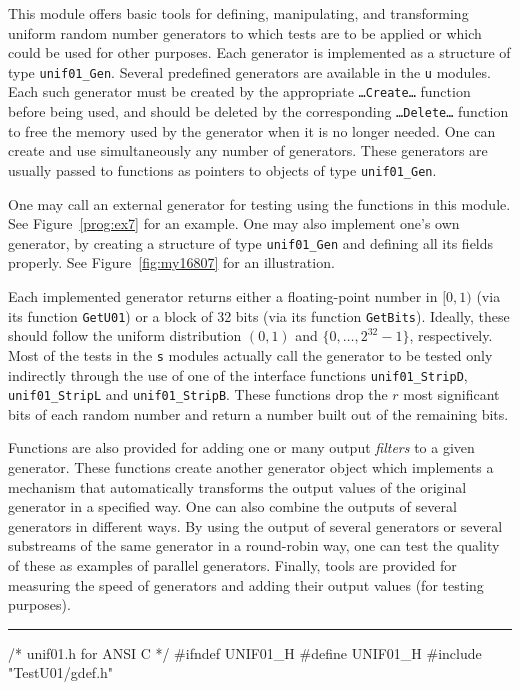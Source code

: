 
This module offers basic tools for defining, manipulating, and
transforming uniform random number generators to which tests are
to be applied or which could be used for other purposes.
Each generator is implemented as a
structure of type {\tt unif01\_Gen}.
Several predefined generators are available in the {\tt u} modules.
Each such generator must be created by the appropriate
{\tt \ldots Create\ldots} function before being used, and should
be deleted by the corresponding {\tt \ldots Delete\ldots} function
to free the memory used by the generator when it is no longer needed.
One can create and use simultaneously any number of generators.
These generators are usually passed to functions as pointers to
objects of type {\tt unif01\_Gen}.

One may call an external generator for testing using the functions in
this module. See Figure~\ref{prog:ex7} for an example.
One may also implement one's own generator, by creating a structure of
type {\tt unif01\_Gen} and defining all its fields properly.
See Figure~\ref{fig:my16807} for an illustration.

Each implemented generator returns either a floating-point
number in $[0, 1)$ (via its function {\tt GetU01})
or a block of 32 bits (via its function {\tt GetBits}).
Ideally, these should follow the uniform distribution $(0,1)$
and $\{0,\dots,2^{32}-1\}$, respectively.
Most of the tests in the {\tt s} modules actually call the generator
to be tested only indirectly through the use of one of the interface
functions {\tt unif01\_StripD},
 {\tt unif01\_StripL} and  {\tt unif01\_StripB}.
These functions drop the $r$ most significant bits of each random number
and return a number built out of the remaining bits.

Functions are also provided for adding one or many output {\em filters\/}
to a given generator. These functions create another generator
object which implements a mechanism that automatically
transforms the output values of the original generator in a specified way.
One can also combine the outputs of several generators in different ways.
By using the output of several generators or several substreams of the
same generator in a round-robin way, one can test the quality of these as
examples of parallel generators.
Finally, tools are provided for measuring the speed of generators
and adding their output values (for testing purposes).



\bigskip\hrule
\code\hide
/*  unif01.h  for ANSI C  */
#ifndef UNIF01_H
#define UNIF01_H
\endhide
#include "TestU01/gdef.h"
\endcode


